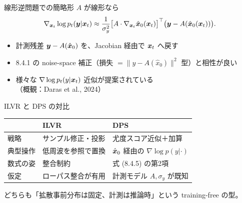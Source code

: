 \asmain
\begin{frame}{線形逆問題での簡略形}
    $A$ が線形なら
    \[
        \nabla_{\bm{x}_t}\log p_t(\bm{y}|\bm{x}_t)
        \approx
        \frac{1}{\sigma_y^{2}}
        \bigl[A\cdot\nabla_{\bm{x}_t}\hat{\bm{x}}_0(\bm{x}_t)\bigr]^{\top}
        \bigl(\bm{y}-A(\hat{\bm{x}}_0(\bm{x}_t))\bigr).
    \]
    \begin{itemize}
        \item 計測残差 $\bm{y}-A(\hat{\bm{x}}_0)$ を、Jacobian 経由で $\bm{x}_t$ へ戻す
        \item 8.4.1 の noise-space 補正（損失 $=\|y-A(\hat x_0)\|^2$ 型）と相性が良い
        \item 様々な $\nabla\log p_t(y|\bm{x}_t)$ 近似が提案されている\\
        （概観：Daras et al., 2024）
    \end{itemize}
\end{frame}
\asmain
\begin{frame}{ILVR と DPS の対比}
    \renewcommand{\arraystretch}{1.2}
    \footnotesize
    \begin{tabular}{lll}
        & \textbf{ILVR} & \textbf{DPS} \\
        \hline
        戦略 & サンプル修正・投影 & 尤度スコア近似＋加算 \\
        典型操作 & 低周波を参照で置換 & $\hat{\bm{x}}_0$ 経由の $\nabla\log p(y|\cdot)$ \\
        数式の姿 & 整合制約 & 式 (8.4.5) の第2項 \\
        仮定 & ローパス整合が有用 & 計測モデル $A,\sigma_y$ が既知 \\
    \end{tabular}
    \normalsize
    \vfill
    どちらも「拡散事前分布は固定、計測は推論時」という training-free の型。
\end{frame}
